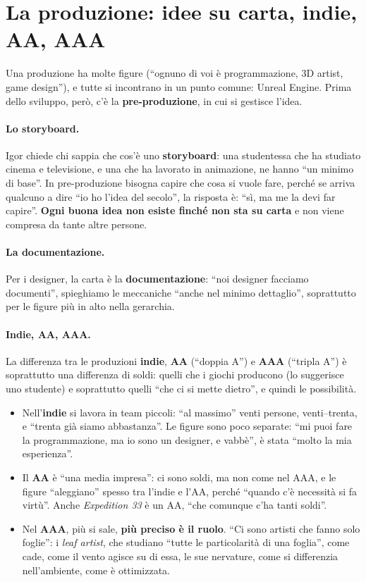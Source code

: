 \section{La produzione: idee su carta, indie, AA, AAA}
\label{ue1:sec:produzione}

Una produzione ha molte figure (``ognuno di voi è programmazione, 3D artist, game
design''), e tutte si incontrano in un punto comune: Unreal Engine. Prima dello
sviluppo, però, c'è la \textbf{pre-produzione}, in cui si gestisce l'idea.

\paragraph{Lo storyboard.} Igor chiede chi sappia che cos'è uno \textbf{storyboard}: una
studentessa che ha studiato cinema e televisione, e una che ha lavorato in animazione,
ne hanno ``un minimo di base''. In pre-produzione bisogna capire che cosa si vuole fare,
perché se arriva qualcuno a dire ``io ho l'idea del secolo'', la risposta è: ``sì, ma
me la devi far capire''. \textbf{Ogni buona idea non esiste finché non sta su carta} e
non viene compresa da tante altre persone.

\paragraph{La documentazione.} Per i designer, la carta è la \textbf{documentazione}:
``noi designer facciamo documenti'', spieghiamo le meccaniche ``anche nel minimo
dettaglio'', soprattutto per le figure più in alto nella gerarchia.

\paragraph{Indie, AA, AAA.} La differenza tra le produzioni \textbf{indie},
\textbf{AA} (``doppia A'') e \textbf{AAA} (``tripla A'') è soprattutto una differenza
di soldi: quelli che i giochi producono (lo suggerisce uno studente) e soprattutto
quelli ``che ci si mette dietro'', e quindi le possibilità.
\begin{itemize}
  \item Nell'\textbf{indie} si lavora in team piccoli: ``al massimo'' venti persone,
        venti--trenta, e ``trenta già siamo abbastanza''. Le figure sono poco
        separate: ``mi puoi fare la programmazione, ma io sono un designer, e vabbè'',
        è stata ``molto la mia esperienza''.
  \item Il \textbf{AA} è ``una media impresa'': ci sono soldi, ma non come nel AAA, e
        le figure ``aleggiano'' spesso tra l'indie e l'AA, perché ``quando c'è
        necessità si fa virtù''. Anche \emph{Expedition 33} è un AA, ``che comunque
        c'ha tanti soldi''.
  \item Nel \textbf{AAA}, più si sale, \textbf{più preciso è il ruolo}. ``Ci sono
        artisti che fanno solo foglie'': i \emph{leaf artist}, che studiano ``tutte le
        particolarità di una foglia'', come cade, come il vento agisce su di essa, le
        sue nervature, come si differenzia nell'ambiente, come è ottimizzata.
\end{itemize}


